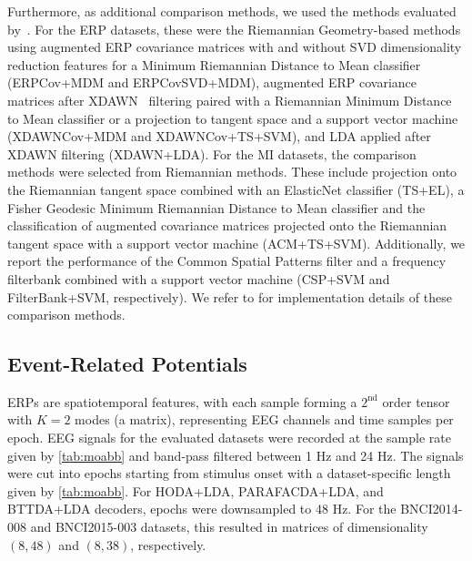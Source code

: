 Furthermore, as additional comparison methods, we used the methods evaluated
by~\textcite{Chevallier2024}.
For the ERP datasets, these were the Riemannian Geometry-based methods
using augmented ERP covariance matrices with and without SVD dimensionality
reduction features for a Minimum Riemannian Distance to Mean classifier
(ERPCov+MDM and ERPCovSVD+MDM), augmented ERP covariance matrices after
XDAWN~\cite{Rivet2009}
filtering paired with a Riemannian Minimum Distance to Mean classifier or a
projection to tangent space and a support vector machine
(XDAWNCov+MDM and XDAWNCov+TS+SVM), and LDA applied after XDAWN filtering
(XDAWN+LDA).
For the MI datasets, the comparison methods were selected from Riemannian
methods.
These include projection onto the Riemannian tangent space combined with an
ElasticNet classifier (TS+EL), a Fisher Geodesic Minimum Riemannian Distance to
Mean classifier and the classification of augmented covariance matrices
projected onto the Riemannian tangent space with a support vector machine
(ACM+TS+SVM).
Additionally, we report the performance of the Common Spatial Patterns filter
and a frequency filterbank combined with a support vector machine (CSP+SVM and
FilterBank+SVM, respectively).
We refer to \textcite{Chevallier2024} for implementation details of these comparison
methods.

\subsection{Event-Related Potentials}
ERPs are spatiotemporal features, with each sample forming a $2^\text{nd}$
order tensor with $K=2$ modes (a matrix), representing EEG channels and time samples
per epoch.
EEG signals for the evaluated datasets were recorded at the sample rate given
by \cref{tab:moabb} and band-pass filtered between 1 Hz
and 24 Hz.
The signals were cut into epochs starting from stimulus onset with a
dataset-specific length given by \cref{tab:moabb}.
For HODA+LDA, PARAFACDA+LDA, and BTTDA+LDA decoders, epochs were downsampled to 48 Hz.
For the BNCI2014-008 and BNCI2015-003 datasets, this resulted in matrices of
dimensionality $(8,48)$ and $(8,38)$, respectively.

